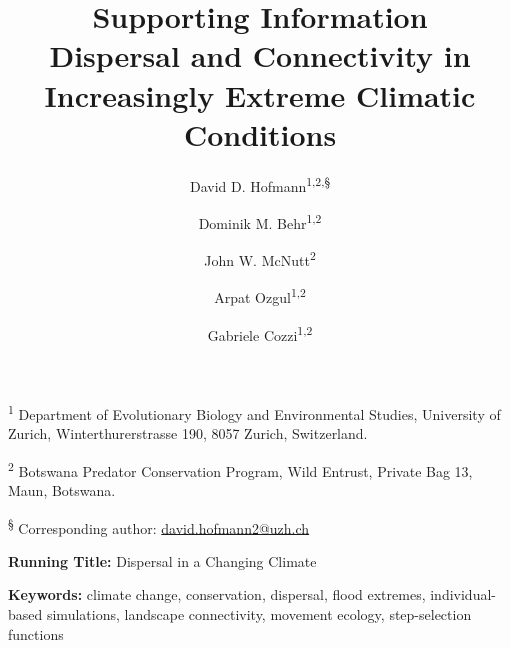 \documentclass[abstract=on,10pt,a4paper,bibliography=totocnumbered]{article}
\title{\textbf{Supporting Information}\\ Dispersal and Connectivity in
Increasingly Extreme Climatic Conditions}
\author{
  David D. Hofmann\textsuperscript{1,2,\S} \orcid{0000-0003-3477-4365} \and
  Dominik M. Behr\textsuperscript{1,2} \orcid{0000-0001-7378-8538} \and
  John W. McNutt\textsuperscript{2} \and
  Arpat Ozgul\textsuperscript{1,2} \orcid{0000-0001-7477-2642} \and
  Gabriele Cozzi\textsuperscript{1,2} \orcid{0000-0002-1744-1940}
}
\renewcommand{\theequation}{Equation \arabic{equation}}%
\newcommand{\beginappendix}{%
  \setcounter{table}{0}
  \renewcommand{\thetable}{S\arabic{table}}%
  \setcounter{figure}{0}
  \renewcommand{\thefigure}{S\arabic{figure}}%
  \setcounter{equation}{0}
  \renewcommand{\theequation}{Equation S\arabic{equation}}%
  \setcounter{section}{0}
  \renewcommand{\thesection}{S\arabic{section}}%
}
\begin{document}

\maketitle

\begin{flushleft}

\vspace{0.5cm}

\textsuperscript{1} Department of Evolutionary Biology and Environmental
Studies, University of Zurich, Winterthurerstrasse 190, 8057 Zurich,
Switzerland.

\textsuperscript{2} Botswana Predator Conservation Program, Wild Entrust,
Private Bag 13, Maun, Botswana.

\textsuperscript{\S} Corresponding author: \href{mailto://david.hofmann2@uzh.ch}{david.hofmann2@uzh.ch}

\vspace{4cm}

\textbf{Running Title:} Dispersal in a Changing Climate

\vspace{0.5cm}

\textbf{Keywords:} climate change, conservation, dispersal, flood extremes,
individual-based simulations, landscape connectivity, movement ecology,
step-selection functions

\end{flushleft}

\newpage



\appendix
\beginappendix

\newpage
\end{document}
